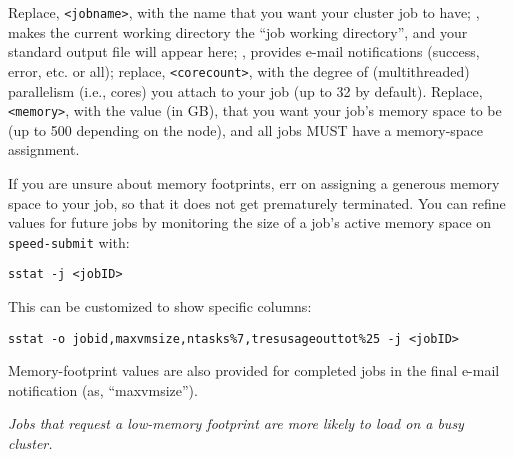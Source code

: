 Replace, \verb+<jobname>+, with the name that you want your cluster job to have;
, makes the current working directory the ``job working directory'',
and your standard output file will appear here; , provides e-mail
notifications (success, error, etc. or all); replace, \verb+<corecount>+, with the degree of
(multithreaded) parallelism (i.e., cores) you attach to your job (up to 32 by default).
Replace, \verb+<memory>+, with the value (in GB), that you want 
your job's memory space to be (up to 500 depending on the node), and all jobs MUST have a memory-space 
assignment.

If you are unsure about memory footprints, err on assigning a generous
memory space to your job, so that it does not get prematurely terminated.
You can refine
values for future jobs by monitoring the size of a job's active
memory space on \texttt{speed-submit} with:


\begin{verbatim}
sstat -j <jobID>
\end{verbatim}

\noindent
This can be customized to show specific columns:

\begin{verbatim}
sstat -o jobid,maxvmsize,ntasks%7,tresusageouttot%25 -j <jobID>
\end{verbatim}

Memory-footprint values are also provided for completed jobs in the final
e-mail notification (as, ``maxvmsize'').

\emph{Jobs that request a low-memory footprint are more likely to load on a busy
cluster.}

